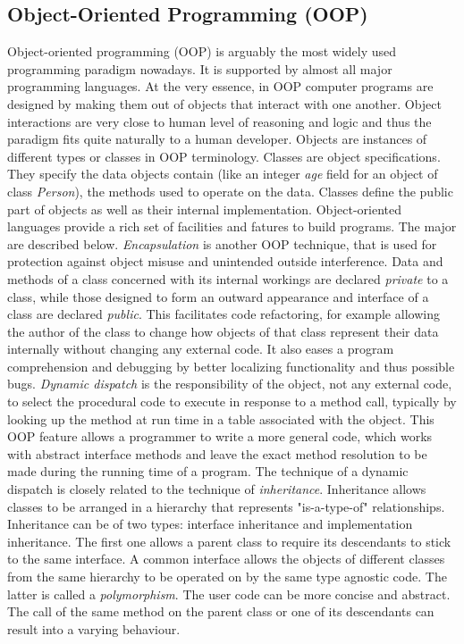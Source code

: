 \subsection{Object-Oriented Programming (OOP)}
\label{background_oop}
\quad Object-oriented programming (OOP) is arguably the most widely used programming paradigm nowadays. It is supported by almost all major programming languages. At the very essence, in OOP computer programs are designed by making them out of objects that interact with one another. Object interactions are very close to human level of reasoning and logic and thus the paradigm fits quite naturally to a human developer.\newline\null
\quad Objects are instances of different types or classes in OOP terminology. Classes are object specifications. They specify the data objects contain (like an integer \textit{age} field for an object of class \textit{Person}), the methods used to operate on the data. Classes define the public part of objects as well as their internal implementation. Object-oriented languages provide a rich set of facilities and fatures to build programs. The major are described below.\newline\null
\quad \textit{Encapsulation} is another OOP technique, that is used for protection against object misuse and unintended outside interference. Data and methods of a class concerned with its internal workings are declared \textit{private} to a class, while those designed to form an outward appearance and interface of a class are declared \textit{public}. This facilitates code refactoring, for example allowing the author of the class to change how objects of that class represent their data internally without changing any external code. It also eases a program comprehension and debugging by better localizing functionality and thus possible bugs.\newline\null
\quad \textit{Dynamic dispatch} is the responsibility of the object, not any external code, to select the procedural code to execute in response to a method call, typically by looking up the method at run time in a table associated with the object. This OOP feature allows a programmer to write a more general code, which works with abstract interface methods and leave the exact method resolution to be made during the running time of a program.\newline\null
\quad The technique of a dynamic dispatch is closely related to the technique of \textit{inheritance}. Inheritance allows classes to be arranged in a hierarchy that represents "is-a-type-of" relationships. Inheritance can be of two types: interface inheritance and implementation inheritance. The first one allows a parent class to require its descendants to stick to the same interface. A common interface allows the objects of different classes from the same hierarchy to be operated on by the same type agnostic code. The latter is called a \textit{polymorphism}. The user code can be more concise and abstract. The call of the same method on the parent class or one of its descendants can result into a varying behaviour.
